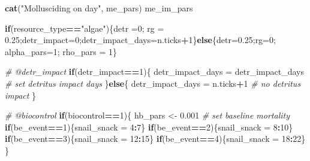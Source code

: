 \documentclass[10,portrait]{article}
\newenvironment{Shaded}{\begin{snugshade}}{\end{snugshade}}
\newcommand{\KeywordTok}[1]{\textcolor[rgb]{0.13,0.29,0.53}{\textbf{#1}}}
\newcommand{\DecValTok}[1]{\textcolor[rgb]{0.00,0.00,0.81}{#1}}
\newcommand{\FloatTok}[1]{\textcolor[rgb]{0.00,0.00,0.81}{#1}}
\newcommand{\StringTok}[1]{\textcolor[rgb]{0.31,0.60,0.02}{#1}}
\newcommand{\CommentTok}[1]{\textcolor[rgb]{0.56,0.35,0.01}{\textit{#1}}}
\newcommand{\ControlFlowTok}[1]{\textcolor[rgb]{0.13,0.29,0.53}{\textbf{#1}}}
\newcommand{\OperatorTok}[1]{\textcolor[rgb]{0.81,0.36,0.00}{\textbf{#1}}}
\newcommand{\NormalTok}[1]{#1}
\begin{document}
\begin{Shaded}
\begin{Highlighting}[]
{{{        \KeywordTok{cat}\NormalTok{(}\StringTok{"Mollusciding on day"}\NormalTok{, me_pars)}
\NormalTok{        me_im_pars}

        \ControlFlowTok{if}\NormalTok{(resource_type}\OperatorTok{==}\StringTok{"algae"}\NormalTok{)\{detr =}\DecValTok{0}\NormalTok{; rg =}\StringTok{ }\FloatTok{0.25}\NormalTok{;detr_impact=}\DecValTok{0}\NormalTok{;detr_impact_days=n.ticks}\OperatorTok{+}\DecValTok{1}\NormalTok{\}}\ControlFlowTok{else}\NormalTok{\{detr=}\FloatTok{0.25}\NormalTok{;rg=}\DecValTok{0}\NormalTok{; alpha_pars=}\DecValTok{1}\NormalTok{; rho_pars =}\StringTok{ }\DecValTok{1}\NormalTok{\}}
        
        \CommentTok{# @detr_impact}
        \ControlFlowTok{if}\NormalTok{(detr_impact}\OperatorTok{==}\DecValTok{1}\NormalTok{)\{}
\NormalTok{          detr_impact_days =}\StringTok{ }\NormalTok{detr_impact_days }\CommentTok{# set detritus impact days }
\NormalTok{        \}}\ControlFlowTok{else}\NormalTok{\{}
\NormalTok{          detr_impact_days =}\StringTok{ }\NormalTok{n.ticks}\OperatorTok{+}\DecValTok{1} \CommentTok{# no detritus impact }
\NormalTok{        \}}
        
        \CommentTok{# @biocontrol}
        \ControlFlowTok{if}\NormalTok{(biocontrol}\OperatorTok{==}\DecValTok{1}\NormalTok{)\{}
\NormalTok{          hb_pars <-}\StringTok{ }\FloatTok{0.001} \CommentTok{# set baseline mortality }
          \ControlFlowTok{if}\NormalTok{(be_event}\OperatorTok{==}\DecValTok{1}\NormalTok{)\{snail_snack =}\StringTok{ }\DecValTok{4}\OperatorTok{:}\DecValTok{7}\NormalTok{\}}
          \ControlFlowTok{if}\NormalTok{(be_event}\OperatorTok{==}\DecValTok{2}\NormalTok{)\{snail_snack =}\StringTok{ }\DecValTok{8}\OperatorTok{:}\DecValTok{10}\NormalTok{\}}
          \ControlFlowTok{if}\NormalTok{(be_event}\OperatorTok{==}\DecValTok{3}\NormalTok{)\{snail_snack =}\StringTok{ }\DecValTok{12}\OperatorTok{:}\DecValTok{15}\NormalTok{\}}
          \ControlFlowTok{if}\NormalTok{(be_event}\OperatorTok{==}\DecValTok{4}\NormalTok{)\{snail_snack =}\StringTok{ }\DecValTok{18}\OperatorTok{:}\DecValTok{22}\NormalTok{\}}
\NormalTok{        \}}
        
}}}
\end{Highlighting}
\end{Shaded}
\end{document}
